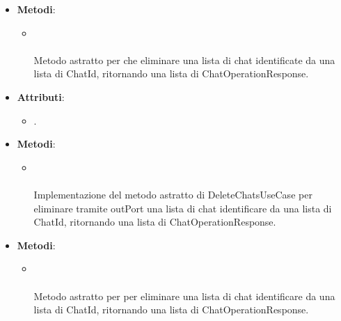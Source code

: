 \documentclass[10pt, a4paper]{article}
\begin{document}
    \label{DeleteChatsUseCaseDettaglio}
    \begin{itemize}
        \item \textbf{Metodi}:
        \begin{itemize}
            \item {}\\ \\
            Metodo astratto per che eliminare una lista di chat identificate da una lista di ChatId, ritornando una lista di ChatOperationResponse.
        \end{itemize}
    \end{itemize}
    
    \label{DeleteChatsServiceDettaglio}
    \begin{itemize}
        \item \textbf{Attributi}:
        \begin{itemize}
            \item {}.
        \end{itemize}
        \item \textbf{Metodi}:
        \begin{itemize}
            \item {}\\ \\
            Implementazione del metodo astratto di DeleteChatsUseCase per eliminare tramite outPort una lista di chat identificare da una lista di ChatId, ritornando una lista di ChatOperationResponse.
        \end{itemize}
    \end{itemize}
    
    \label{DeleteChatsPortDettaglio}
    \begin{itemize}
        \item \textbf{Metodi}:
        \begin{itemize}
            \item {}\\ \\
            Metodo astratto per per eliminare una lista di chat identificare da una lista di ChatId, ritornando una lista di ChatOperationResponse.
        \end{itemize}
    \end{itemize}
    
\end{document}
